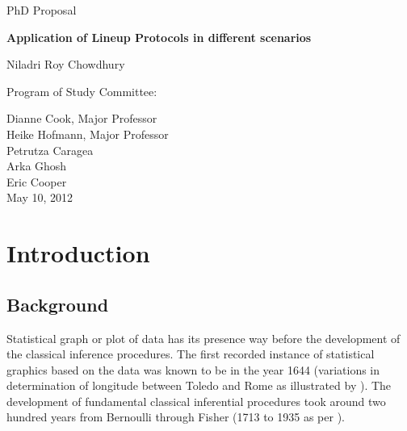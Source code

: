 \documentclass[12]{report}
\begin{document}
\thispagestyle{empty}

\begin{center}

\vspace{2in}

PhD Proposal \\ 

\vspace{.5in}

\Large{\bf Application of Lineup Protocols in different scenarios }

\vspace{1in}

\large{Niladri Roy Chowdhury} 

\vspace{3in}
Program of Study Committee: 

\vspace{.5in}
Dianne Cook, Major Professor \\
Heike Hofmann, Major Professor \\
Petrutza Caragea \\
Arka Ghosh \\
Eric Cooper\\

\vspace{1.5in}
May 10, 2012 
\end{center}

\tableofcontents

\chapter{Introduction}\label{ch:introduction}


\section{Background}Statistical graph or plot of data has its presence way before the development of the classical inference procedures. The first recorded instance of statistical graphics based on the data was known to be in the year 1644 (variations in determination of longitude between Toledo and Rome as illustrated by \cite{friendly:2001}). The development of fundamental classical inferential procedures took around two hundred years from Bernoulli through Fisher (1713 to 1935 as per \cite{hald:2004}). 
\end{document}
